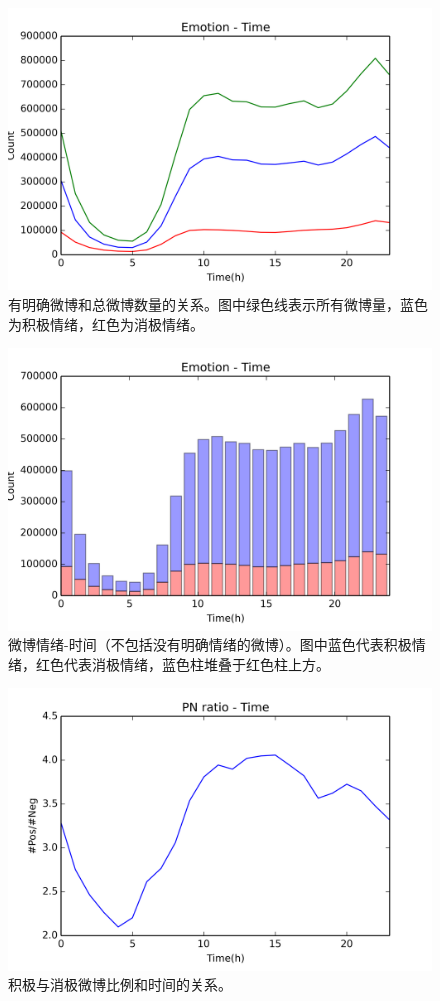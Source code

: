 \documentclass[12pt, oneside]{article}
\begin{document}
\begin{spacing}{1.5}
\begin{CJK}{UTF8}{gbsn}
\begin{figure}
	\centering
	\includegraphics[width=0.8\linewidth]{../result/charts/emotion_time_1}
	\caption{有明确微博和总微博数量的关系。图中绿色线表示所有微博量，蓝色为积极情绪，红色为消极情绪。}
	\label{fig:emotion_time_1}
\end{figure}
\begin{figure}
	\centering
	\includegraphics[width=0.8\linewidth]{../result/charts/emotion_time_2}
	\caption{微博情绪-时间（不包括没有明确情绪的微博）。图中蓝色代表积极情绪，红色代表消极情绪，蓝色柱堆叠于红色柱上方。}
	\label{fig:emotion_time_2}
\end{figure}
\begin{figure}
	\centering
	\includegraphics[width=0.8\linewidth]{../result/charts/emotion_time_3}
	\caption{积极与消极微博比例和时间的关系。}
	\label{fig:emotion_time_3}
\end{figure}


\end{CJK}
\end{spacing}
\end{document}

